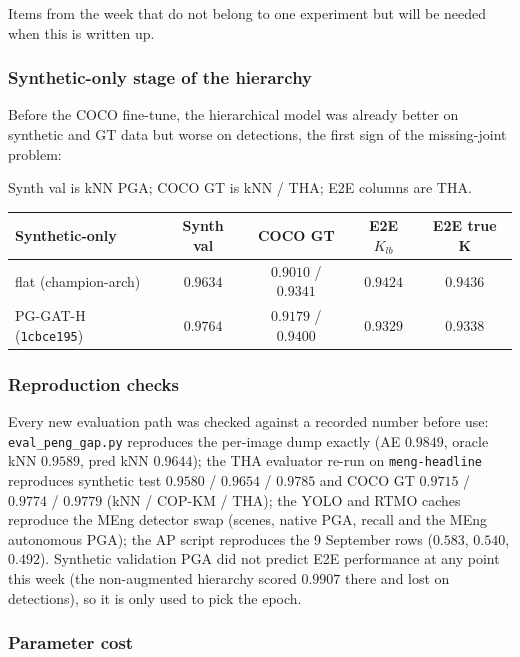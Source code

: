 Items from the week that do not belong to one experiment but will be needed when this is written up.

\subsubsection{Synthetic-only stage of the hierarchy}

Before the COCO fine-tune, the hierarchical model was already better on synthetic and GT data but worse on detections, the first sign of the missing-joint problem:

Synth val is kNN PGA; COCO GT is kNN / THA; E2E columns are THA.

\vspace{0.5em}

\begin{tabular}{lcccc}
\hline
\textbf{Synthetic-only} & \textbf{Synth val} & \textbf{COCO GT} & \textbf{E2E $K_{lb}$} & \textbf{E2E true K} \\
\hline
flat (champion-arch)      & $0.9634$ & $0.9010$ / $0.9341$ & $\mathbf{0.9424}$ & $\mathbf{0.9436}$ \\
PG-GAT-H (\texttt{1cbce195})     & $\mathbf{0.9764}$ & $\mathbf{0.9179}$ / $\mathbf{0.9400}$ & $0.9329$ & $0.9338$ \\
\hline
\end{tabular}

\subsubsection{Reproduction checks}

Every new evaluation path was checked against a recorded number before use: \texttt{eval\_peng\_gap.py} reproduces the per-image dump exactly (AE $0.9849$, oracle kNN $0.9589$, pred kNN $0.9644$); the THA evaluator re-run on \texttt{meng-headline} reproduces synthetic test $0.9580$ / $0.9654$ / $0.9785$ and COCO GT $0.9715$ / $0.9774$ / $0.9779$ (kNN / COP-KM / THA); the YOLO and RTMO caches reproduce the MEng detector swap (scenes, native PGA, recall and the MEng autonomous PGA); the AP script reproduces the 9 September rows ($0.583$, $0.540$, $0.492$). Synthetic validation PGA did not predict E2E performance at any point this week (the non-augmented hierarchy scored $0.9907$ there and lost on detections), so it is only used to pick the epoch.

\subsubsection{Parameter cost}

